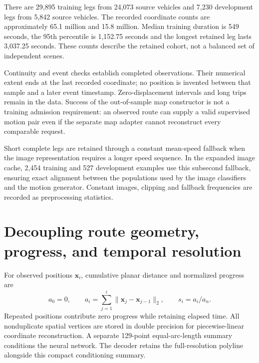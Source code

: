 

There are 29,895 training legs from 24,073 source vehicles and 7,230 development legs from 5,842 source vehicles. The recorded coordinate counts are approximately 65.1 million and 15.8 million. Median training duration is 549 seconds, the 95th percentile is 1,152.75 seconds and the longest retained leg lasts 3,037.25 seconds. These counts describe the retained cohort, not a balanced set of independent scenes.

Continuity and event checks establish completed observations. Their numerical extent ends at the last recorded coordinate; no position is invented between that sample and a later event timestamp. Zero-displacement intervals and long trips remain in the data. Success of the out-of-sample map constructor is not a training admission requirement: an observed route can supply a valid supervised motion pair even if the separate map adapter cannot reconstruct every comparable request.

Short complete legs are retained through a constant mean-speed fallback when the image representation requires a longer speed sequence. In the expanded image cache, 2,454 training and 527 development examples use this subsecond fallback, ensuring exact alignment between the populations used by the image classifiers and the motion generator. Constant images, clipping and fallback frequencies are recorded as preprocessing statistics.

\section{Decoupling route geometry, progress, and temporal resolution}
For observed positions $\mathbf x_i$, cumulative planar distance and normalized progress are
\begin{equation}
 a_0=0,\qquad a_i=\sum_{j=1}^{i}\|\mathbf x_j-\mathbf x_{j-1}\|_2,
 \qquad s_i=a_i/a_n.
 \label{eq:native-observed-progress}
\end{equation}
Repeated positions contribute zero progress while retaining elapsed time. All nonduplicate spatial vertices are stored in double precision for piecewise-linear coordinate reconstruction. A separate 129-point equal-arc-length summary conditions the neural network. The decoder retains the full-resolution polyline alongside this compact conditioning summary.

